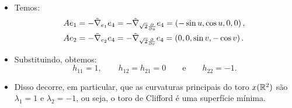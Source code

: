 \documentclass[10pt,a4paper]{beamer}
\theoremstyle{definition}
\begin{document}
\begin{frame}

	\begin{itemize}
		
		\item Temos:
		\begin{align*}
		A e_1 &= -\tilde{\nabla}_{e_1} e_4 = -\tilde{\nabla}_{\sqrt{2} \frac{\partial}{\partial u}} e_4 = \left( -\sin u, \cos u, 0, 0 \right),\\
		A e_2 &= -\tilde{\nabla}_{e_2} e_4 = -\tilde{\nabla}_{\sqrt{2} \frac{\partial}{\partial v}} e_4 = \left( 0,0, \sin v, -\cos v \right).
		\end{align*}
		
		\pause
		
		\item Substituindo, obtemos:
		\[ h_{11} = 1, \qquad h_{12}=h_{21}=0 \qquad \text{e} \qquad h_{22} = -1. \]
		
		\pause
		
		\item Disso decorre, em particular, que as curvaturas principais do toro $x(\mathbb R^2)$ são $\lambda_1 = 1$ e $\lambda_2 = -1$, ou seja, \alert{o toro de Clifford é uma superfície mínima}.
	\end{itemize}
	

\end{frame}
\end{document}
